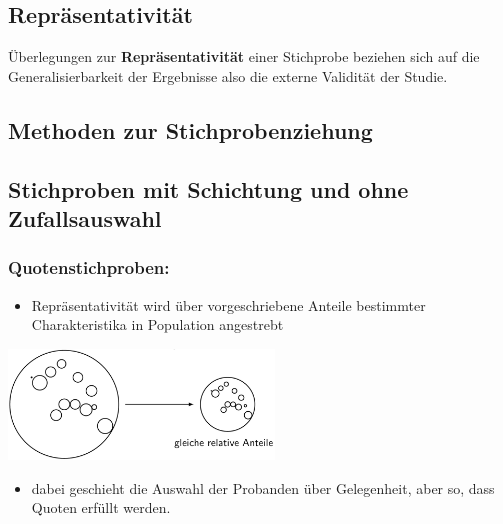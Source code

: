 \documentclass[
]{book}
\providecommand{\tightlist}{%
  \setlength{\itemsep}{0pt}\setlength{\parskip}{0pt}}
\begin{document}
\hypertarget{repruxe4sentativituxe4t}{%
\subsection{Repräsentativität}\label{repruxe4sentativituxe4t}}

Überlegungen zur \textbf{Repräsentativität} einer Stichprobe beziehen sich auf die Generalisierbarkeit der Ergebnisse also die externe Validität der Studie.

\hypertarget{methoden-zur-stichprobenziehung}{%
\subsection{Methoden zur Stichprobenziehung}\label{methoden-zur-stichprobenziehung}}

\hypertarget{stichproben-mit-schichtung-und-ohne-zufallsauswahl}{%
\subsection{Stichproben mit Schichtung und ohne Zufallsauswahl}\label{stichproben-mit-schichtung-und-ohne-zufallsauswahl}}

\hypertarget{quotenstichproben}{%
\subsubsection{Quotenstichproben:}\label{quotenstichproben}}

\begin{itemize}
\tightlist
\item
  Repräsentativität wird über vorgeschriebene Anteile bestimmter Charakteristika in Population angestrebt
\end{itemize}

\begin{center}\includegraphics[width=200pt]{imgs/schichtung_zufall} \end{center}

\begin{itemize}
\tightlist
\item
  dabei geschieht die Auswahl der Probanden über Gelegenheit, aber so, dass Quoten erfüllt werden.
\end{itemize}
\end{document}
